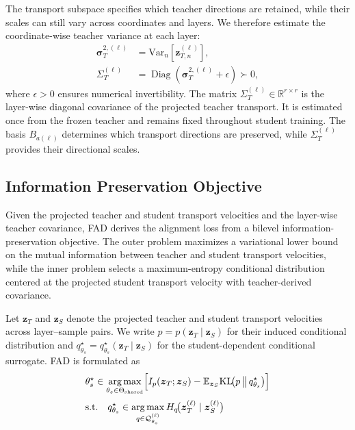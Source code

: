 \documentclass[letterpaper]{article} %
\newcommand{\E}{\mathbb{E}}
\newcommand{\R}{\mathbb{R}}
\newcommand{\calQ}{\mathcal{Q}}
\newcommand{\KL}{\mathrm{KL}}
\newcommand{\Var}{\mathrm{Var}}
\newcommand{\bz}{\boldsymbol{z}}
\newcommand{\bSigma}{\varSigma}
\newcommand{\bB}{B}
\newcommand{\Diag}{\operatorname{Diag}}
\newcommand{\bsigma}{\boldsymbol{\sigma}}
\theoremstyle{plain}
\theoremstyle{definition}
\begin{document}
The transport subspace specifies which teacher directions are retained,
while their scales can still vary across coordinates and layers. We therefore
estimate the coordinate-wise teacher variance at each layer:
\begin{equation}
\begin{aligned}
  \bsigma_T^{2,(\ell)}
  &=
  \Var_n\!\left[
    \bz_{T,n}^{(\ell)}
  \right],
  \\
  \bSigma_T^{(\ell)}
  &=
  \Diag\!\left(
    \bsigma_T^{2,(\ell)}
    +
    \epsilon
  \right)
  \succ 0,
\end{aligned}
\label{eq:teacher-covariance}
\end{equation}
where $\epsilon>0$ ensures numerical invertibility.
The matrix
$\bSigma_T^{(\ell)}\in\R^{r\times r}$
is the layer-wise diagonal covariance of the projected teacher transport.
It is estimated once from the frozen teacher and remains fixed throughout
student training. The basis $\bB_{a(\ell)}$ determines which transport
directions are preserved, while $\bSigma_T^{(\ell)}$ provides their
directional scales.

\subsection{Information Preservation Objective}
\label{sec:objective}

Given the projected teacher and student transport velocities and the layer-wise teacher covariance, FAD derives the alignment loss from a bilevel information-preservation objective. The outer problem maximizes a variational lower bound on the mutual information between teacher and student transport velocities, while the inner problem selects a maximum-entropy conditional distribution centered at the projected student transport velocity with teacher-derived covariance.

Let $\bz_T$ and $\bz_S$ denote the projected teacher and student transport velocities across layer--sample pairs. We write $p=p(\bz_T\!\mid\!\bz_S)$ for their induced conditional distribution and $q_{\theta_s}^{\star} =q_{\theta_s}^{\star}(\bz_T\!\mid\!\bz_S)$ for the student-dependent conditional surrogate. FAD is formulated as
\begin{equation}
\begin{aligned}
  &\theta_s^\star
  \in
  \operatorname*{arg\,max}_{\theta_s\in\Theta_{\mathrm{shared}}}
  \Bigl[
    I_p(\bz_T;\bz_S)
    - \E_{\bz_S}
    \KL\!\bigl(
      p\,\big\|\,q^\star_{\theta_s}
    \bigr)
  \Bigr]\\[2pt]
  &\text{s.t.}\quad
  q^\star_{\theta_s}
  \in
  \operatorname*{arg\,max}_{q\in\calQ_{\theta_s}^{(\ell)}}
  H_q\!\bigl(
    \bz_T^{(\ell)}
    \mid
    \bz_S^{(\ell)}
  \bigr)
\end{aligned}
\label{eq:bilevel}
\end{equation}
\end{document}
